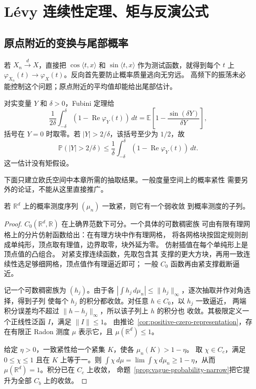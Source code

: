 \section{Lévy 连续性定理、矩与反演公式}
\label{sec:levy-moments-inversion}

\subsection{原点附近的变换与尾部概率}

若 $X_n\xrightarrow dX$，直接把 $\cos\langle t,x\rangle$ 和
$\sin\langle t,x\rangle$ 作为测试函数，就得到每个 $t$ 上
$\varphi_{X_n}(t)\to\varphi_X(t)$。反向首先要防止概率质量逃向无穷远。
高频下的振荡未必能控制这个问题；原点附近的平均值却能给出尾部估计。

对实变量 $Y$ 和 $\delta>0$，Fubini 定理给
\[
 \frac1{2\delta}\int_{-\delta}^{\delta}(1-\operatorname{Re}\varphi_Y(t))\,dt
 =\mathbb E\left[1-\frac{\sin(\delta Y)}{\delta Y}\right],
\]
括号在 $Y=0$ 时取零。若 $|Y|>2/\delta$，该括号至少为 $1/2$，故
\begin{equation}
\label{eq:characteristic-tightness-bound}
 \mathbb P(|Y|>2/\delta)
 \le\frac1\delta\int_{-\delta}^{\delta}
             (1-\operatorname{Re}\varphi_Y(t))\,dt.
\end{equation}
这一估计没有矩假设。

下面只建立欧氏空间中本章所需的抽取结果。一般度量空间上的概率紧性
需要另外的论证，不能从这里直接推广。

\begin{lemma}[欧氏空间中的一致紧序列]
\label{lem:euclidean-tight-subsequence}
若 $\mathbb R^d$ 上的概率测度序列 $(\mu_n)$ 一致紧，则它有一个弱收敛
到概率测度的子列。
\end{lemma}

\begin{proof}
$C_0(\mathbb R^d,\mathbb R)$ 在上确界范数下可分。一个具体的可数稠密族
可由有限有理网格上的分片仿射函数给出：在有理方块中作有理网格，
将各网格块按固定规则剖成单纯形，顶点取有理值，边界取零，块外延为零。
仿射插值在每个单纯形上是顶点值的凸组合。
对紧支撑连续函数，先取包含其
支撑的更大方块，再用一致连续性选足够细网格，顶点值作有理逼近即可；
一般 $C_0$ 函数再由紧支撑截断逼近。

记一个可数稠密族为 $(h_j)$。由于各
$|\int h_j\,d\mu_n|\le\|h_j\|_\infty$，逐次抽取并作对角选择，得到子列
使每个 $h_j$ 的积分都收敛。对任意 $h\in C_0$，以 $h_j$ 一致逼近，
两端积分误差均不超过 $\|h-h_j\|_\infty$，所以该子列上 $h$ 的积分也
收敛。其极限定义一个正线性泛函 $I$，满足 $\|I\|\le1$。
由推论~\ref{cor:positive-czero-representation}，存在有限正 Radon 测度
$\mu$ 表示它，且 $\mu(\mathbb R^d)\le1$。

给定 $\eta>0$，一致紧性给一个紧集 $K$，使各 $\mu_n(K)>1-\eta$。
取 $\chi\in C_c$，满足 $0\le\chi\le1$ 且在 $K$ 上等于一。则
$\int\chi\,d\mu=\lim\int\chi\,d\mu_n\ge1-\eta$，从而
$\mu(\mathbb R^d)=1$。积分已在 $C_c$ 上收敛，
命题~\ref{prop:vague-probability-narrow}把它提升为全部 $C_b$ 上的收敛。
\end{proof}

